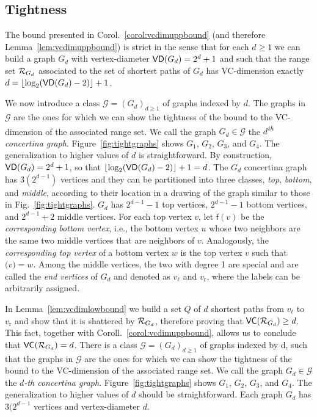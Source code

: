 \subsection{Tightness}\label{sec:tightness}
The bound presented in Corol.~\ref{corol:vcdimuppbound} (and therefore
Lemma~\ref{lem:vcdimuppbound}) is strict in the sense that
for each $d\ge 1$ we can build a graph $G_d$ with vertex-diameter
$\mathsf{VD}(G_d)=2^d+1$ and such that the range set $\mathcal{R}_{G_d}$ associated to the set of
shortest paths of $G_d$ has VC-dimension exactly
$d=\lfloor\log_2(\mathsf{VD}(G_d)-2)\rfloor+1$. 

\ifproof
We now introduce a class $\mathcal{G}=(G_d)_{d\ge 1}$ of graphs indexed by $d$.
The graphs in $\mathcal{G}$ are the ones for which we can show the tightness of
the bound to the VC-dimension of the associated range set.
We call the graph $G_d\in\mathcal{G}$ the \emph{$d$\textsuperscript{th} concertina graph}.
Figure~\ref{fig:tightgraphs} shows $G_1$, $G_2$, $G_3$, and $G_4$. The
generalization to higher values of $d$ is straightforward.
By construction, $\mathsf{VD}(G_d)=2^d+1$, so that
$\lfloor\log_2(\mathsf{VD}(G_d)-2)\rfloor+1=d$. The $G_d$ concertina graph has 
$3(2^{d-1})$ vertices and they can be partitioned into three classes,
\emph{top}, \emph{bottom}, and \emph{middle},
according to their location in a drawing of the graph similar to those in
Fig.~\ref{fig:tightgraphs}. $G_d$ has $2^{d-1}-1$ top vertices, $2^{d-1}-1$
bottom vertices, and $2^{d-1}+2$ middle vertices. For each top vertex $v$, let
$\mathsf{f}(v)$ be the \emph{corresponding bottom vertex}, i.e., the bottom
vertex $u$ whose two neighbors are the same two middle vertices that are
neighbors of $v$. Analogously, the \emph{corresponding top vertex} of a bottom
vertex $w$ is the top vertex $v$ such that $\mathsf(v)=w$. Among the middle
vertices, the two with degree 1 are special and are called the \emph{end
vertices} of $G_d$ and denoted as $v_\ell$ and $v_\mathrm{r}$, where the labels
can be arbitrarily assigned. 

In Lemma~\ref{lem:vcdimlowbound} we build a set $Q$ of $d$ shortest paths from
$v_\ell$ to $v_\mathrm{r}$ and show that it is shattered by $\mathcal{R}_{G_d}$,
therefore proving that $\mathsf{VC}(\mathcal{R}_{G_d})\ge d$. This fact, together with
Coroll.~\ref{corol:vcdimuppbound}, allows us to conclude that $\mathsf{VC}(\mathcal{R}_{G_d})=d$. 
\else
There is a class $\mathcal{G}=(G_d)_{d\ge 1}$ of graphs indexed by d, such that
the graphs in $\mathcal{G}$ are the ones for which we can show the tightness of
the bound to the VC-dimension of the associated range set. We call the graph
$G_d\in\mathcal{G}$ the \emph{$d$-th concertina graph}.
Figure~\ref{fig:tightgraphs} shows $G_1$, $G_2$, $G_3$, and $G_4$. The
generalization to higher values of $d$ should be straightforward. Each graph
$G_d$ has $3(2^{d-1}$ vertices and vertex-diameter $d$.


